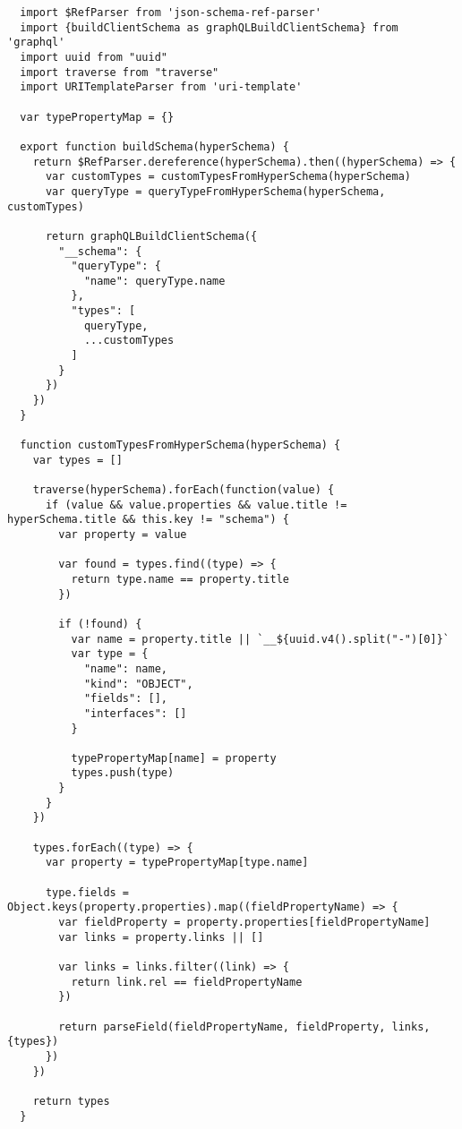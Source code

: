\begin{verbatim}
  import $RefParser from 'json-schema-ref-parser'
  import {buildClientSchema as graphQLBuildClientSchema} from 'graphql'
  import uuid from "uuid"
  import traverse from "traverse"
  import URITemplateParser from 'uri-template'

  var typePropertyMap = {}

  export function buildSchema(hyperSchema) {
    return $RefParser.dereference(hyperSchema).then((hyperSchema) => {
      var customTypes = customTypesFromHyperSchema(hyperSchema)
      var queryType = queryTypeFromHyperSchema(hyperSchema, customTypes)

      return graphQLBuildClientSchema({
        "__schema": {
          "queryType": {
            "name": queryType.name
          },
          "types": [
            queryType,
            ...customTypes
          ]
        }
      })
    })
  }

  function customTypesFromHyperSchema(hyperSchema) {
    var types = []

    traverse(hyperSchema).forEach(function(value) {
      if (value && value.properties && value.title != hyperSchema.title && this.key != "schema") {
        var property = value

        var found = types.find((type) => {
          return type.name == property.title
        })

        if (!found) {
          var name = property.title || `__${uuid.v4().split("-")[0]}`
          var type = {
            "name": name,
            "kind": "OBJECT",
            "fields": [],
            "interfaces": []
          }

          typePropertyMap[name] = property
          types.push(type)
        }
      }
    })

    types.forEach((type) => {
      var property = typePropertyMap[type.name]

      type.fields = Object.keys(property.properties).map((fieldPropertyName) => {
        var fieldProperty = property.properties[fieldPropertyName]
        var links = property.links || []

        var links = links.filter((link) => {
          return link.rel == fieldPropertyName
        })

        return parseField(fieldPropertyName, fieldProperty, links, {types})
      })
    })

    return types
  }


\end{verbatim}
